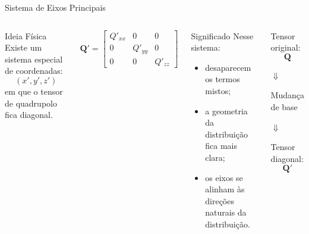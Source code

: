 \documentclass[aspectratio=169]{beamer}
\begin{document}
\begin{frame}{Sistema de Eixos Principais}

\begin{columns}[T]


\begin{mybox}{Ideia Física}
Existe um sistema especial de coordenadas:
\[
(x',y',z')
\]
em que o tensor de quadrupolo fica diagonal.
\end{mybox}

\vspace{0.2cm}

\begin{eqbox}
\begin{equation}
\mathbf Q'=
\begin{bmatrix}
Q'_{xx} & 0 & 0
\\
0 & Q'_{yy} & 0
\\
0 & 0 & Q'_{zz}
\end{bmatrix}
\end{equation}
\end{eqbox}


\begin{alertblock}{Significado}
Nesse sistema:
\begin{itemize}
\item desaparecem os termos mistos;

\vspace{0.15cm}

\item a geometria da distribuição fica mais clara;

\vspace{0.15cm}

\item os eixos se alinham às direções naturais da distribuição.
\end{itemize}
\end{alertblock}

\vspace{0.3cm}

\begin{center}

\Large
Tensor original:
\[
\mathbf Q
\]

\vspace{0.2cm}

\Large
\(\Downarrow\)

\vspace{0.2cm}

\Large
Mudança de base

\vspace{0.2cm}

\Large
\(\Downarrow\)

\vspace{0.2cm}

\Large
Tensor diagonal:
\[
\mathbf Q'
\]

\end{center}

\end{columns}

\end{frame}
\end{document}
